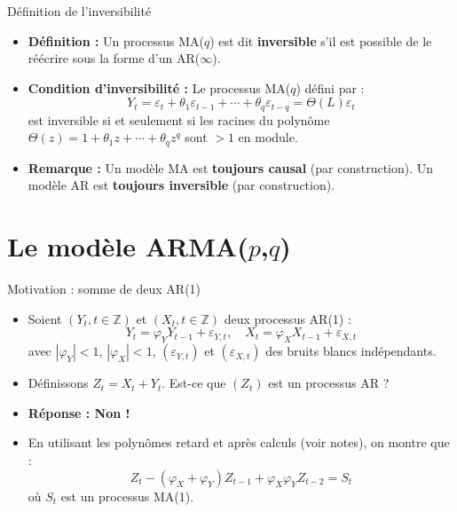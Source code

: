 \documentclass[11pt,aspectratio=169]{beamer}
\newcommand{\Z}{\mathbb{Z}}
\begin{document}
\begin{frame}{Définition de l'inversibilité}

\begin{itemize}

\item \textbf{Définition :} Un processus MA($q$) est dit \textbf{inversible} s'il est possible de le réécrire sous la forme d'un AR($\infty$).\newline

\item \textbf{Condition d'inversibilité :} Le processus MA($q$) défini par :
\[
Y_t = \varepsilon_t + \theta_1 \varepsilon_{t-1} + \cdots + \theta_q \varepsilon_{t-q} = \Theta(L) \varepsilon_t
\]
est inversible si et seulement si les racines du polynôme $\Theta(z) = 1 + \theta_1 z + \cdots + \theta_q z^q$ sont $> 1$ en module.\newline

\item \textbf{Remarque :} Un modèle MA est \textbf{toujours causal} (par construction). Un modèle AR est \textbf{toujours inversible} (par construction).

\end{itemize}
\end{frame}

\section{Le modèle ARMA($p$,$q$)}

\begin{frame}{Motivation : somme de deux AR(1)}

\begin{itemize}

\item Soient $(Y_t, t \in \Z)$ et $(X_t, t \in \Z)$ deux processus AR(1) :
\[
Y_t = \varphi_Y Y_{t-1} + \varepsilon_{Y,t}, \quad X_t = \varphi_X X_{t-1} + \varepsilon_{X,t}
\]
avec $|\varphi_Y| < 1$, $|\varphi_X| < 1$, $(\varepsilon_{Y,t})$ et $(\varepsilon_{X,t})$ des bruits blancs indépendants.\newline

\item Définissons $Z_t = X_t + Y_t$. Est-ce que $(Z_t)$ est un processus AR ?\newline

\item \textbf{Réponse : Non !}\newline

\item En utilisant les polynômes retard et après calculs (voir notes), on montre que :
\[
Z_t - (\varphi_X + \varphi_Y) Z_{t-1} + \varphi_X \varphi_Y Z_{t-2} = S_t
\]
où $S_t$ est un processus MA(1).

\end{itemize}
\end{frame}
\end{document}
